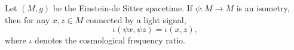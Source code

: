 Let $(M, g)$ be the Einstein-de Sitter spacetime. If $\psi: M \to M$ is an isometry, then for any $x, z \in M$ connected by a light signal,
$$\iota(\psi x, \psi z) = \iota(x, z),$$
where $\iota$ denotes the cosmological frequency ratio.
